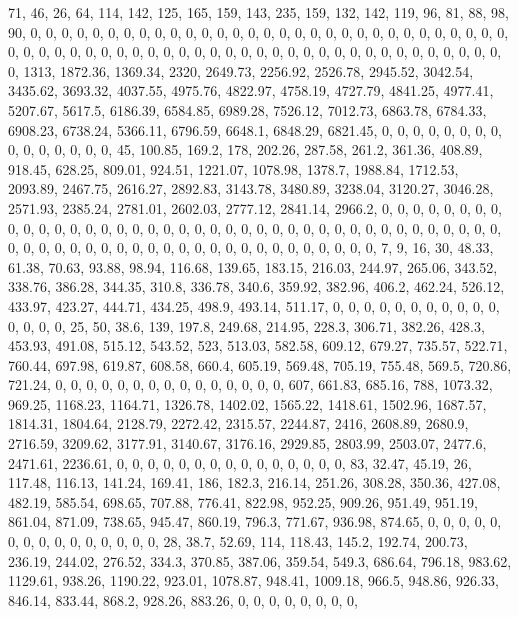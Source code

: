 \documentclass[
]{article}
\begin{document}
71, 46, 26, 64, 114, 142, 125, 165, 159, 143, 235, 159, 132, 142, 119,
96, 81, 88, 98, 90, 0, 0, 0, 0, 0, 0, 0, 0, 0, 0, 0, 0, 0, 0, 0, 0, 0,
0, 0, 0, 0, 0, 0, 0, 0, 0, 0, 0, 0, 0, 0, 0, 0, 0, 0, 0, 0, 0, 0, 0, 0,
0, 0, 0, 0, 0, 0, 0, 0, 0, 0, 0, 0, 0, 0, 0, 0, 0, 0, 0, 0, 0, 0, 0,
1313, 1872.36, 1369.34, 2320, 2649.73, 2256.92, 2526.78, 2945.52,
3042.54, 3435.62, 3693.32, 4037.55, 4975.76, 4822.97, 4758.19, 4727.79,
4841.25, 4977.41, 5207.67, 5617.5, 6186.39, 6584.85, 6989.28, 7526.12,
7012.73, 6863.78, 6784.33, 6908.23, 6738.24, 5366.11, 6796.59, 6648.1,
6848.29, 6821.45, 0, 0, 0, 0, 0, 0, 0, 0, 0, 0, 0, 0, 0, 0, 0, 45,
100.85, 169.2, 178, 202.26, 287.58, 261.2, 361.36, 408.89, 918.45,
628.25, 809.01, 924.51, 1221.07, 1078.98, 1378.7, 1988.84, 1712.53,
2093.89, 2467.75, 2616.27, 2892.83, 3143.78, 3480.89, 3238.04, 3120.27,
3046.28, 2571.93, 2385.24, 2781.01, 2602.03, 2777.12, 2841.14, 2966.2,
0, 0, 0, 0, 0, 0, 0, 0, 0, 0, 0, 0, 0, 0, 0, 0, 0, 0, 0, 0, 0, 0, 0, 0,
0, 0, 0, 0, 0, 0, 0, 0, 0, 0, 0, 0, 0, 0, 0, 0, 0, 0, 0, 0, 0, 0, 0, 0,
0, 0, 0, 0, 0, 0, 0, 0, 0, 0, 0, 0, 0, 0, 0, 0, 7, 9, 16, 30, 48.33,
61.38, 70.63, 93.88, 98.94, 116.68, 139.65, 183.15, 216.03, 244.97,
265.06, 343.52, 338.76, 386.28, 344.35, 310.8, 336.78, 340.6, 359.92,
382.96, 406.2, 462.24, 526.12, 433.97, 423.27, 444.71, 434.25, 498.9,
493.14, 511.17, 0, 0, 0, 0, 0, 0, 0, 0, 0, 0, 0, 0, 0, 0, 0, 25, 50,
38.6, 139, 197.8, 249.68, 214.95, 228.3, 306.71, 382.26, 428.3, 453.93,
491.08, 515.12, 543.52, 523, 513.03, 582.58, 609.12, 679.27, 735.57,
522.71, 760.44, 697.98, 619.87, 608.58, 660.4, 605.19, 569.48, 705.19,
755.48, 569.5, 720.86, 721.24, 0, 0, 0, 0, 0, 0, 0, 0, 0, 0, 0, 0, 0, 0,
0, 607, 661.83, 685.16, 788, 1073.32, 969.25, 1168.23, 1164.71, 1326.78,
1402.02, 1565.22, 1418.61, 1502.96, 1687.57, 1814.31, 1804.64, 2128.79,
2272.42, 2315.57, 2244.87, 2416, 2608.89, 2680.9, 2716.59, 3209.62,
3177.91, 3140.67, 3176.16, 2929.85, 2803.99, 2503.07, 2477.6, 2471.61,
2236.61, 0, 0, 0, 0, 0, 0, 0, 0, 0, 0, 0, 0, 0, 0, 0, 83, 32.47, 45.19,
26, 117.48, 116.13, 141.24, 169.41, 186, 182.3, 216.14, 251.26, 308.28,
350.36, 427.08, 482.19, 585.54, 698.65, 707.88, 776.41, 822.98, 952.25,
909.26, 951.49, 951.19, 861.04, 871.09, 738.65, 945.47, 860.19, 796.3,
771.67, 936.98, 874.65, 0, 0, 0, 0, 0, 0, 0, 0, 0, 0, 0, 0, 0, 0, 0, 28,
38.7, 52.69, 114, 118.43, 145.2, 192.74, 200.73, 236.19, 244.02, 276.52,
334.3, 370.85, 387.06, 359.54, 549.3, 686.64, 796.18, 983.62, 1129.61,
938.26, 1190.22, 923.01, 1078.87, 948.41, 1009.18, 966.5, 948.86,
926.33, 846.14, 833.44, 868.2, 928.26, 883.26, 0, 0, 0, 0, 0, 0, 0, 0,
\end{document}
